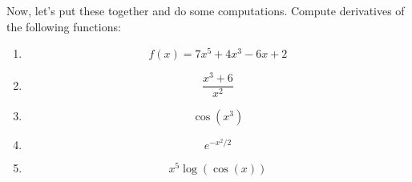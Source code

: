 \documentclass[12pt,a4paper]{article} %
\begin{document}
Now, let's put these together and do some computations. Compute derivatives of the following functions:
\begin{enumerate}
\item $$f(x) = 7x^5+4x^3-6x+2$$
\item $$\frac{x^3+6}{x^2}$$
\item $$\cos(x^3)$$
\item $$e^{-x^2/2}$$
\item $$x^5\log(\cos(x))$$

\end{enumerate}
\end{document}
